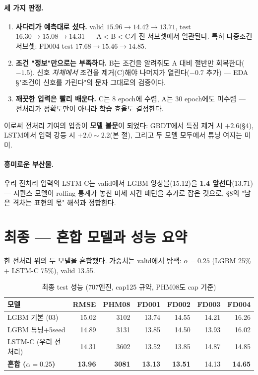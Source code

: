 \documentclass[11pt]{article}
\begin{document}
\paragraph{세 가지 판정.}
\begin{enumerate}[nosep]
  \item \textbf{사다리가 예측대로 섰다.} valid $15.96 \to 14.42 \to 13.71$, test $16.30 \to 15.08 \to 14.31$ —
        A$<$B$<$C가 전 서브셋에서 일관된다. 특히 다중조건 서브셋: FD004 test $17.68 \to 15.46 \to 14.85$.
  \item \textbf{조건 "정보"만으로는 부족하다.} B는 조건을 알려줘도 A 대비 절반만 회복한다($-1.5$).
        신호 \emph{자체에서} 조건을 제거(C)해야 나머지가 열린다($-0.7$ 추가) —
        EDA \S"조건이 신호를 가린다"의 문자 그대로의 검증이다.
  \item \textbf{깨끗한 입력은 빨리 배운다.} C는 8 epoch에 수렴, A는 30 epoch에도 미수렴 —
        전처리가 정확도만이 아니라 학습 효율도 결정한다.
\end{enumerate}

이로써 전처리 기여의 입증이 \textbf{모델 불문}이 되었다:
GBDT에서 특징 제거 시 $+2.6$(\S4), LSTM에서 입력 강등 시 $+2.0\sim2.2$(본 절), 그리고 두 모델 모두에서 튜닝 여지는 미미.

\paragraph{흥미로운 부산물.}
우리 전처리 입력의 LSTM-C는 valid에서 LGBM 앙상블(15.12)을 \textbf{1.4 앞선다}(13.71) —
시퀀스 모델이 rolling 통계가 놓친 미세 시간 패턴을 추가로 잡은 것으로, \S8의 "남은 격차는 표현의 몫" 해석과 정합한다.

\section{최종 — 혼합 모델과 성능 요약}

한 전처리 위의 두 모델을 혼합했다.
가중치는 valid에서 탐색: $\alpha=0.25$ (LGBM 25\% $+$ LSTM-C 75\%), valid 13.55.

\begin{table}[H]
\centering
\caption{최종 test 성능 (707엔진, cap125 규약, PHM08도 cap 기준)}
\label{tab:final}
\begin{tabular}{lrrrrrr}
\toprule
모델 & RMSE & PHM08 & FD001 & FD002 & FD003 & FD004 \\
\midrule
LGBM 기본 (03) & 15.02 & 3102 & 13.74 & 14.55 & 14.21 & 16.26 \\
LGBM 튜닝$+$5seed & 14.89 & 3131 & 13.85 & 14.50 & 13.93 & 16.02 \\
LSTM-C (우리 전처리) & 14.31 & 3602 & 13.52 & 13.85 & 14.87 & 14.85 \\
\textbf{혼합 ($\alpha{=}0.25$)} & \textbf{13.96} & \textbf{3081} & \textbf{13.13} & \textbf{13.51} & 14.13 & \textbf{14.65} \\
\bottomrule
\end{tabular}
\end{table}
\end{document}
